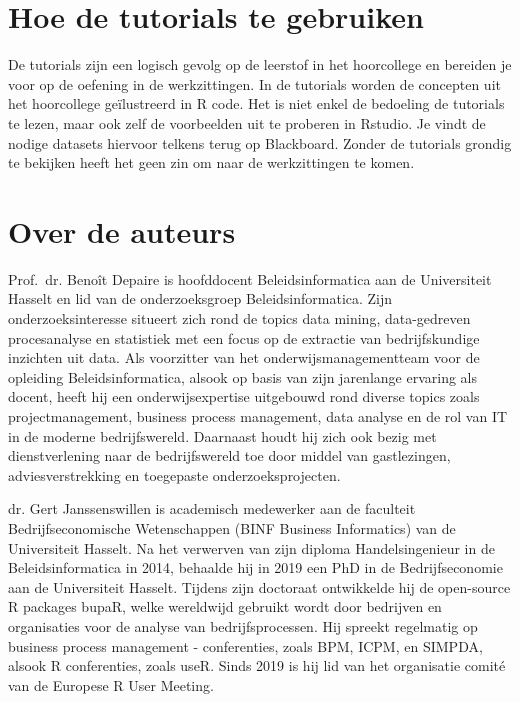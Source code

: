 \documentclass[]{tufte-book}
\begin{document}
\hypertarget{hoe-de-tutorials-te-gebruiken}{%
\section*{Hoe de tutorials te gebruiken}\label{hoe-de-tutorials-te-gebruiken}}

De tutorials zijn een logisch gevolg op de leerstof in het hoorcollege en bereiden je voor op de oefening in de werkzittingen. In de tutorials worden de concepten uit het hoorcollege geïlustreerd in R code. Het is niet enkel de bedoeling de tutorials te lezen, maar ook zelf de voorbeelden uit te proberen in Rstudio. Je vindt de nodige datasets hiervoor telkens terug op Blackboard. Zonder de tutorials grondig te bekijken heeft het geen zin om naar de werkzittingen te komen.

\hypertarget{over-de-auteurs}{%
\section*{Over de auteurs}\label{over-de-auteurs}}

Prof.~dr. Benoît Depaire is hoofddocent Beleidsinformatica aan de Universiteit Hasselt en lid van de onderzoeksgroep Beleidsinformatica. Zijn onderzoeksinteresse situeert zich rond de topics data mining, data-gedreven procesanalyse en statistiek met een focus op de extractie van bedrijfskundige inzichten uit data. Als voorzitter van het onderwijsmanagementteam voor de opleiding Beleidsinformatica, alsook op basis van zijn jarenlange ervaring als docent, heeft hij een onderwijsexpertise uitgebouwd rond diverse topics zoals projectmanagement, business process management, data analyse en de rol van IT in de moderne bedrijfswereld. Daarnaast houdt hij zich ook bezig met dienstverlening naar de bedrijfswereld toe door middel van gastlezingen, adviesverstrekking en toegepaste onderzoeksprojecten.

dr. Gert Janssenswillen is academisch medewerker aan de faculteit Bedrijfseconomische Wetenschappen (BINF Business Informatics) van de Universiteit Hasselt. Na het verwerven van zijn diploma Handelsingenieur in de Beleidsinformatica in 2014, behaalde hij in 2019 een PhD in de Bedrijfseconomie aan de Universiteit Hasselt. Tijdens zijn doctoraat ontwikkelde hij de open-source R packages bupaR, welke wereldwijd gebruikt wordt door bedrijven en organisaties voor de analyse van bedrijfsprocessen. Hij spreekt regelmatig op business process management - conferenties, zoals BPM, ICPM, en SIMPDA, alsook R conferenties, zoals useR. Sinds 2019 is hij lid van het organisatie comité van de Europese R User Meeting.
\end{document}
